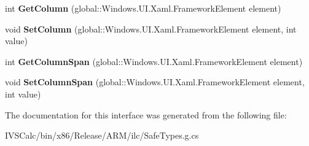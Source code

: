 \begin{DoxyCompactItemize}
\item 
\mbox{\label{interface_windows_1_1_u_i_1_1_xaml_1_1_controls_1_1_i_grid_statics_a5669711d053518b49290b7556a8ba584}} 
int {\bfseries Get\+Column} (global\+::\+Windows.\+U\+I.\+Xaml.\+Framework\+Element element)
\item 
\mbox{\label{interface_windows_1_1_u_i_1_1_xaml_1_1_controls_1_1_i_grid_statics_a73679f372e5c95be6df634924e36dc2c}} 
void {\bfseries Set\+Column} (global\+::\+Windows.\+U\+I.\+Xaml.\+Framework\+Element element, int value)
\item 
\mbox{\label{interface_windows_1_1_u_i_1_1_xaml_1_1_controls_1_1_i_grid_statics_aeb5b4c961c8bdfd7fb2625d5ae893664}} 
int {\bfseries Get\+Column\+Span} (global\+::\+Windows.\+U\+I.\+Xaml.\+Framework\+Element element)
\item 
\mbox{\label{interface_windows_1_1_u_i_1_1_xaml_1_1_controls_1_1_i_grid_statics_ac9860a85b2ffd6bee23d564be6744824}} 
void {\bfseries Set\+Column\+Span} (global\+::\+Windows.\+U\+I.\+Xaml.\+Framework\+Element element, int value)
\end{DoxyCompactItemize}


The documentation for this interface was generated from the following file\+:\begin{DoxyCompactItemize}
\item 
I\+V\+S\+Calc/bin/x86/\+Release/\+A\+R\+M/ilc/Safe\+Types.\+g.\+cs\end{DoxyCompactItemize}
